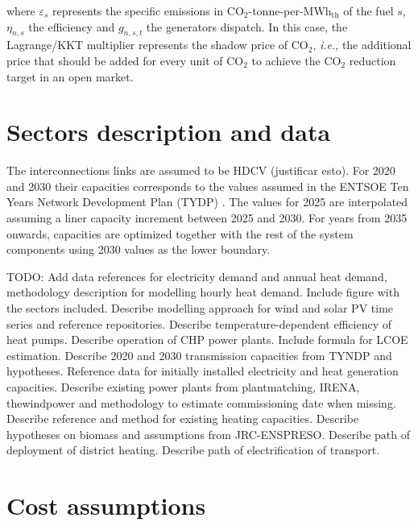 \documentclass[3p]{elsarticle} %
\def\th{${}_{\textrm{th}}$}
\begin{document}
where $\varepsilon_{s}$ represents the specific emissions in CO$_2$-tonne-per-MWh\th{} of the fuel $s$, $\eta_{n,s}$ the efficiency and $g_{n,s,t}$ the generators dispatch. In this case, the Lagrange/KKT multiplier represents the shadow price of CO$_2$, \textit{i.e.}, the additional price that should be added for every unit of CO$_2$ to achieve the CO$_2$ reduction target in an open market. 

\section{Sectors description and data}
The interconnections links are assumed to be HDCV (justificar esto). For 2020 and 2030 their capacities corresponds to the values assumed in the ENTSOE Ten Years Network Development Plan (TYDP) \cite{}. The values for 2025 are interpolated assuming a liner capacity increment between 2025 and 2030. For years from 2035 onwards, capacities are optimized together with the rest of the system components using 2030 values as the lower \textcolor[rgb]{1,0,0}{boundary}. 



\textcolor[rgb]{1,0,0}{TODO: 
Add data references for electricity demand and annual heat demand, methodology description for modelling hourly heat demand. 
Include figure with the sectors included. 
Describe modelling approach for wind and solar PV time series and reference repositories. 
Describe temperature-dependent efficiency of heat pumps. Describe operation of CHP power plants. 
Include formula for LCOE estimation.  
Describe 2020 and 2030 transmission capacities from TYNDP and hypotheses. 
Reference data for initially installed electricity and heat generation capacities. 
Describe existing power plants from plantmatching, IRENA, thewindpower and methodology to estimate commissioning date when missing. Describe reference and method for existing heating capacities.
Describe hypotheses on biomass and assumptions from JRC-ENSPRESO. 
Describe path of deployment of district heating.  
Describe path of electrification of transport. 
}

\section{Cost assumptions}	
\end{document}
